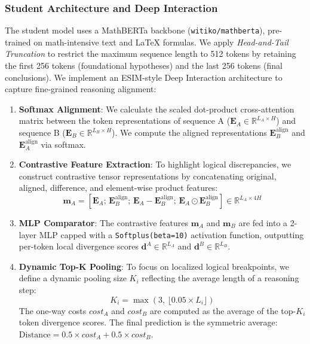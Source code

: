 \documentclass[conference]{IEEEtran}
\begin{document}
\subsubsection{Student Architecture and Deep Interaction}
The student model uses a MathBERTa backbone (\texttt{witiko/mathberta}), pre-trained on math-intensive text and LaTeX formulas. We apply \textit{Head-and-Tail Truncation} to restrict the maximum sequence length to 512 tokens by retaining the first 256 tokens (foundational hypotheses) and the last 256 tokens (final conclusions).
We implement an ESIM-style Deep Interaction architecture to capture fine-grained reasoning alignment:
\begin{enumerate}
    \item \textbf{Softmax Alignment}: We calculate the scaled dot-product cross-attention matrix between the token representations of sequence A ($\mathbf{E}_A \in \mathbb{R}^{L_A \times H}$) and sequence B ($\mathbf{E}_B \in \mathbb{R}^{L_B \times H}$). We compute the aligned representations $\mathbf{E}_B^{\text{align}}$ and $\mathbf{E}_A^{\text{align}}$ via softmax.
    \item \textbf{Contrastive Feature Extraction}: To highlight logical discrepancies, we construct contrastive tensor representations by concatenating original, aligned, difference, and element-wise product features:
    \begin{equation}
    \mathbf{m}_A = [\mathbf{E}_A;\, \mathbf{E}_B^{\text{align}};\, \mathbf{E}_A - \mathbf{E}_B^{\text{align}};\, \mathbf{E}_A \odot \mathbf{E}_B^{\text{align}}] \in \mathbb{R}^{L_A \times 4H}
    \end{equation}
    \item \textbf{MLP Comparator}: The contrastive features $\mathbf{m}_A$ and $\mathbf{m}_B$ are fed into a 2-layer MLP capped with a \texttt{Softplus(beta=10)} activation function, outputting per-token local divergence scores $\mathbf{d}^A \in \mathbb{R}^{L_A}$ and $\mathbf{d}^B \in \mathbb{R}^{L_B}$.
    \item \textbf{Dynamic Top-K Pooling}: To focus on localized logical breakpoints, we define a dynamic pooling size $K_i$ reflecting the average length of a reasoning step:
    \begin{equation}
    K_i = \max\left(3,\, \lfloor 0.05 \times L_i \rfloor\right)
    \end{equation}
    The one-way costs $cost_A$ and $cost_B$ are computed as the average of the top-$K_i$ token divergence scores. The final prediction is the symmetric average: $\text{Distance} = 0.5 \times cost_A + 0.5 \times cost_B$.
\end{enumerate}
\end{document}
